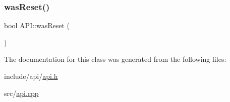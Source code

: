 \mbox{\label{class_a_p_i_ab754e11300491d9efee2da2eda368d93}} 
\subsubsection{\texorpdfstring{was\+Reset()}{wasReset()}}
{\footnotesize\ttfamily bool A\+P\+I\+::was\+Reset (\begin{DoxyParamCaption}{ }\end{DoxyParamCaption})\hspace{0.3cm}{\ttfamily [static]}}



The documentation for this class was generated from the following files\+:\begin{DoxyCompactItemize}
\item 
include/api/\hyperlink{api_8h}{api.\+h}\item 
src/\hyperlink{api_8cpp}{api.\+cpp}\end{DoxyCompactItemize}
